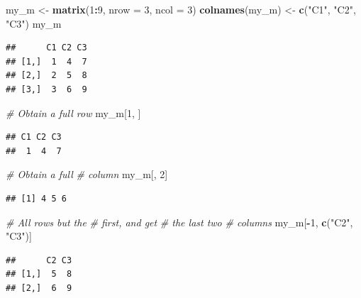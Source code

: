\documentclass[
]{book}
\newenvironment{Shaded}{\begin{snugshade}}{\end{snugshade}}
\newcommand{\CommentTok}[1]{\textcolor[rgb]{0.56,0.35,0.01}{\textit{#1}}}
\newcommand{\DataTypeTok}[1]{\textcolor[rgb]{0.13,0.29,0.53}{#1}}
\newcommand{\DecValTok}[1]{\textcolor[rgb]{0.00,0.00,0.81}{#1}}
\newcommand{\KeywordTok}[1]{\textcolor[rgb]{0.13,0.29,0.53}{\textbf{#1}}}
\newcommand{\NormalTok}[1]{#1}
\newcommand{\OperatorTok}[1]{\textcolor[rgb]{0.81,0.36,0.00}{\textbf{#1}}}
\newcommand{\StringTok}[1]{\textcolor[rgb]{0.31,0.60,0.02}{#1}}
\begin{document}
\begin{Shaded}
\begin{Highlighting}[]
\NormalTok{my_m <-}\StringTok{ }\KeywordTok{matrix}\NormalTok{(}\DecValTok{1}\OperatorTok{:}\DecValTok{9}\NormalTok{, }\DataTypeTok{nrow =} \DecValTok{3}\NormalTok{,}
    \DataTypeTok{ncol =} \DecValTok{3}\NormalTok{)}
\KeywordTok{colnames}\NormalTok{(my_m) <-}\StringTok{ }\KeywordTok{c}\NormalTok{(}\StringTok{"C1"}\NormalTok{,}
    \StringTok{"C2"}\NormalTok{, }\StringTok{"C3"}\NormalTok{)}
\NormalTok{my_m}
\end{Highlighting}
\end{Shaded}

\begin{verbatim}
##      C1 C2 C3
## [1,]  1  4  7
## [2,]  2  5  8
## [3,]  3  6  9
\end{verbatim}

\begin{Shaded}
\begin{Highlighting}[]
\CommentTok{# Obtain a full row}
\NormalTok{my_m[}\DecValTok{1}\NormalTok{, ]}
\end{Highlighting}
\end{Shaded}

\begin{verbatim}
## C1 C2 C3 
##  1  4  7
\end{verbatim}

\begin{Shaded}
\begin{Highlighting}[]
\CommentTok{# Obtain a full}
\CommentTok{# column}
\NormalTok{my_m[, }\DecValTok{2}\NormalTok{]}
\end{Highlighting}
\end{Shaded}

\begin{verbatim}
## [1] 4 5 6
\end{verbatim}

\begin{Shaded}
\begin{Highlighting}[]
\CommentTok{# All rows but the}
\CommentTok{# first, and get}
\CommentTok{# the last two}
\CommentTok{# columns}
\NormalTok{my_m[}\OperatorTok{-}\DecValTok{1}\NormalTok{, }\KeywordTok{c}\NormalTok{(}\StringTok{"C2"}\NormalTok{, }\StringTok{"C3"}\NormalTok{)]}
\end{Highlighting}
\end{Shaded}

\begin{verbatim}
##      C2 C3
## [1,]  5  8
## [2,]  6  9
\end{verbatim}
\end{document}
